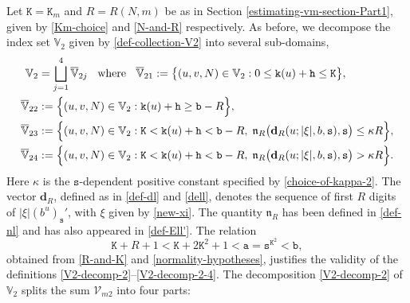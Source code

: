 \documentclass[12pt, twoside]{article}
\theoremstyle{definition}
\numberwithin{equation}{section}
\begin{document}
Let $\mathtt K = \mathtt K_m$ and $R = R(N, m)$ be as in Section \ref{estimating-vm-section-Part1}, given by \eqref{Km-choice} and \eqref{N-and-R} respectively. As before, we decompose the index set $\mathbb V_2$ given by \eqref{def-collection-V2} into several sub-domains,   
\begin{align} 
\mathbb V_2 &= \bigsqcup_{j=1}^{4} \overline{\mathbb V}_{2j} \; \; \text{ where } \; \; \overline{\mathbb V}_{21} := \bigl\{(u, v, N) \in \mathbb V_2 : 0 \leq \mathtt k(u) + \mathtt h \leq \mathtt K \bigr\},  \label{V2-decomp-2} \\ 
\overline{\mathbb V}_{22} &:= \Bigl\{(u, v, N) \in \mathbb V_2 : \mathtt k(u) + \mathtt h \geq \mathtt b - R \Bigr\}, \\  
\overline{\mathbb V}_{23} &:= \Bigl\{(u, v, N) \in \mathbb V_2 : \mathtt K < \mathtt k(u) + \mathtt h < \mathtt b - R, \;  \mathfrak n_{R}\bigl({\mathbf d}_R(u; {|\xi|}, b, \mathtt s), \mathtt s \bigr) \leq \kappa R  \Bigr\}, \label{V23-bar} \\ 
\overline{\mathbb V}_{24} &:= \Bigl\{(u, v, N) \in \mathbb V_2 : \mathtt K < \mathtt k(u) + \mathtt h < \mathtt b - R, \;  \mathfrak n_{R}\bigl({\mathbf d}_R(u; {|\xi|}, b, \mathtt s), \mathtt s \bigr) > \kappa R  \Bigr\}. \label{V2-decomp-2-4}
\end{align} 
Here $\kappa$ is the $\mathtt s$-dependent positive constant specified by \eqref{choice-of-kappa-2}. The vector $\mathbf d
_{R}$, defined as in \eqref{def-dl} and \eqref{dell}, denotes the sequence of first $R$ digits of $|\xi| (b^u)_{\mathtt s}'$, with $\xi$ given by \eqref{new-xi}. The quantity $\mathfrak n_{R}$ has been defined in \eqref{def-nl} and has also appeared in \eqref{def-Ell'}. The relation 
\[ \mathtt K + R + 1 < \mathtt K + 2 \mathtt K^2 + 1< \mathtt a = \mathtt s^{\mathtt K^2} < \mathtt b, \] obtained from \eqref{R-and-K} and \eqref{normality-hypotheses}, justifies the validity of the definitions \eqref{V2-decomp-2}--\eqref{V2-decomp-2-4}. The decomposition \eqref{V2-decomp-2} of $\mathbb V_2$ splits the sum $\mathcal V_{m2}$ into four parts:   
\end{document}
